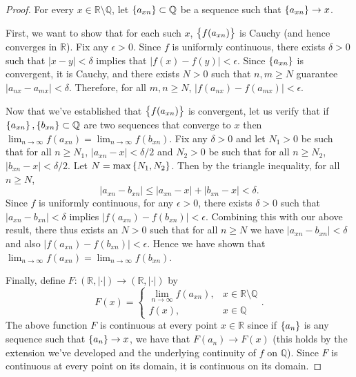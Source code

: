 \documentclass{article}
\newcommand{\Q}{\mathbb{Q}}
\newcommand{\R}{\mathbb{R}}
\begin{document}
\begin{proof}

For every $x \in \R \setminus \Q$, let $\cbr{a_{xn}} \subset \Q$ be a
sequence such that $\cbr{a_{xn}} \to x$.

First, we want to show that for each such $x$, $\cbr{f(a_{xn})}$ is
Cauchy (and hence converges in $\R$). Fix any $\epsilon > 0$. Since $f$
is uniformly continuous, there exists $\delta > 0$ such that $|x - y| <
\delta$ implies that $|f(x) - f(y)| < \epsilon$. Since $\cbr{a_{xn}}$ is
convergent, it is Cauchy, and there exists $N > 0$ such that $n, m \geq
N$ guarantee $|a_{nx} - a_{mx}| < \delta$. Therefore, for all $m, n \geq
N$, $|f(a_{nx}) - f(a_{mx})| < \epsilon$.

Now that we've established that $\cbr{f(a_{xn})}$ is convergent, let us
verify that if $\cbr{a_{xn}}, \cbr{b_{xn}} \subset \Q$ are two sequences
that converge to $x$ then $\lim_{n \to \infty} f(a_{xn}) = \lim_{n \to
\infty} f(b_{xn})$. Fix any $\delta > 0$ and let $N_1 > 0$ be such that
for all $n \geq N_1$, $|a_{xn} - x| < \delta / 2$ and $N_2 > 0$ be such
that for all $n \geq N_2$, $|b_{xn} - x| < \delta / 2$. Let $N =
\max\cbr{N_1, N_2}$. Then by the triangle inequality, for all $n \geq
N$,
%
\begin{equation*}
    |a_{xn} - b_{xn}| \leq |a_{xn} - x| + |b_{xn} - x| < \delta
    .
\end{equation*}
%
Since $f$ is uniformly continuous, for any $\epsilon > 0$, there exists
$\delta > 0$ such that $|a_{xn} - b_{xn}| < \delta$ implies $|f(a_{xn})
- f(b_{xn})| < \epsilon$. Combining this with our above result, there thus
exists an $N > 0$ such that for all $n \geq N$ we have $|a_{xn} -
b_{xn}| < \delta$ and also $|f(a_{xn}) - f(b_{xn})| < \epsilon$. Hence
we have shown that $\lim_{n \to \infty} f(a_{xn}) = \lim_{n \to \infty}
f(b_{xn})$.

Finally, define $F: (\R, |\cdot|) \to (\R, |\cdot|)$ by
%
\begin{equation*}
    F(x) =
        \begin{cases}
            \lim_{n \to \infty} f(a_{xn}), & x \in \R \setminus \Q \\
            f(x), & x \in \Q
        \end{cases}
        .
\end{equation*}
%
The above function $F$ is continuous at every point $x \in \R$ since if
$\cbr{a_n}$ is any sequence such that $\cbr{a_n} \to x$, we have that
$F(a_n) \to F(x)$ (this holds by the extension we've developed and the
underlying continuity of $f$ on $\Q$). Since $F$ is continuous at every
point on its domain, it is continuous on its domain.

\end{proof}
\end{document}

